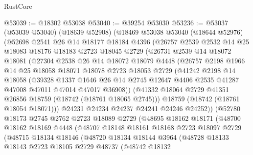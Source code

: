 \begin{lexlean}{RustCore}
\begin{coremodule}
@53039 := @18302 @53038
@53040 := @39254 @53030
@53236 := @53037
    (@53039 @53040)
    (@18639 @52908)
    (@18469
      @53038
      @53040
      (@18644 @52976)
      (@52698
        @2541
        @26
        @14
        @18177
        @18184
        @4396
        (@26757
          @2539
          @2532
          @14
          @25
          @18083
          @18176
          @18183
          @2723
          @18045
          @2729
          (@26731
            @2539
            @14
            @18072
            @18081
            (@27304
              @2538
              @26
              @14
              @18072
              @18079
              @4448
              (@26757
                @2198
                @1966
                @14
                @25
                @18058
                @18071
                @18078
                @2723
                @18053
                @2729
                (@41242
                  @2198
                  @14
                  @18058
                  (@39328
                    @1337
                    @1646
                    @26
                    @14
                    @2745
                    @12647
                    @4406
                    @2535
                    @41287
                    @47008
                    @47011
                    @47014
                    @47017
                    @36908))
                (@41332 @18064 @2729 @41351 @26856 @18759 (@18742 (@18761 @18065 @2745)))
                @18759
                (@18742 (@18761 @18054 @18071)))
              @24231
              @24234
              @24237
              @24241
              @24246
              @24252))
          (@52780
            @18173
            @2745
            @2762
            @2723
            @18089
            @2729
            (@48695
              @18162
              @18171
              (@48700
                @18162
                @18169
                @4448
                (@48707
                  @18148
                  @18161
                  @18168
                  @2723
                  @18097
                  @2729
                  (@48715
                    @18134
                    @18146
                    (@48720
                      @18134
                      @18144
                      @3964
                      (@48728
                        @18133
                        @18143
                        @2723
                        @18105
                        @2729
                        @48737
                        (@48742
                          @18132

\end{coremodule}
\end{lexlean}
